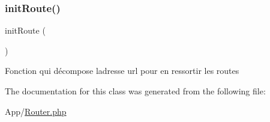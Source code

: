 \subsubsection{\texorpdfstring{init\+Route()}{initRoute()}}
{\footnotesize\ttfamily init\+Route (\begin{DoxyParamCaption}{ }\end{DoxyParamCaption})}

Fonction qui décompose l\textquotesingle{}adresse url pour en ressortir les routes 

The documentation for this class was generated from the following file\+:\begin{DoxyCompactItemize}
\item 
App/\hyperlink{_router_8php}{Router.\+php}\end{DoxyCompactItemize}
